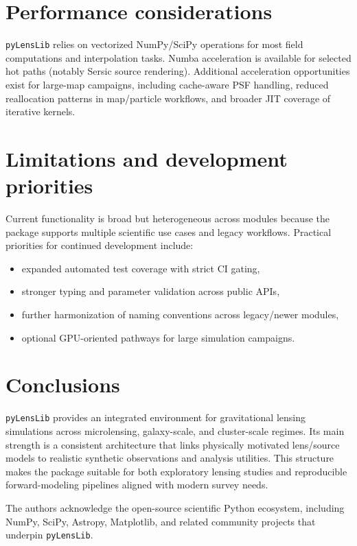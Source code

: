 \documentclass{aa}
\newcommand{\pylenslib}{\texttt{pyLensLib}\xspace}
\begin{document}
\section{Performance considerations}
\pylenslib relies on vectorized NumPy/SciPy operations for most field computations and interpolation tasks. Numba acceleration is available for selected hot paths (notably Sersic source rendering). Additional acceleration opportunities exist for large-map campaigns, including cache-aware PSF handling, reduced reallocation patterns in map/particle workflows, and broader JIT coverage of iterative kernels.

\section{Limitations and development priorities}
Current functionality is broad but heterogeneous across modules because the package supports multiple scientific use cases and legacy workflows. Practical priorities for continued development include:
\begin{itemize}
\item expanded automated test coverage with strict CI gating,
\item stronger typing and parameter validation across public APIs,
\item further harmonization of naming conventions across legacy/newer modules,
\item optional GPU-oriented pathways for large simulation campaigns.
\end{itemize}

\section{Conclusions}
\pylenslib provides an integrated environment for gravitational lensing simulations across microlensing, galaxy-scale, and cluster-scale regimes. Its main strength is a consistent architecture that links physically motivated lens/source models to realistic synthetic observations and analysis utilities. This structure makes the package suitable for both exploratory lensing studies and reproducible forward-modeling pipelines aligned with modern survey needs.

\begin{acknowledgements}
The authors acknowledge the open-source scientific Python ecosystem, including NumPy, SciPy, Astropy, Matplotlib, and related community projects that underpin \pylenslib.
\end{acknowledgements}
\end{document}

